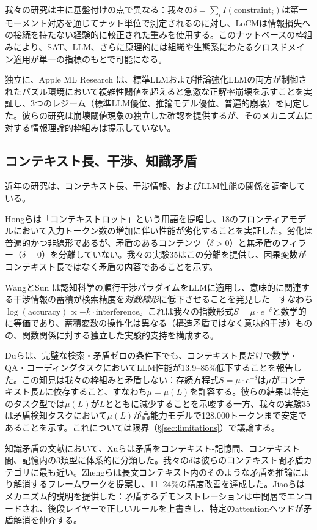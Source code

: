 \documentclass[11pt,a4paper]{article}
\begin{document}
我々の研究は主に基盤付けの点で異なる：我々の$\delta = \sum_i I(\text{constraint}_i)$は第一モーメント対応を通じてナット単位で測定されるのに対し、LoCMは情報損失への接続を持たない経験的に較正された重みを使用する。このナットベースの枠組みにより、SAT、LLM、さらに原理的には組織や生態系にわたるクロスドメイン適用が単一の指標のもとで可能になる。

独立に、Apple ML Research \cite{apple2025illusion}は、標準LLMおよび推論強化LLMの両方が制御されたパズル環境において複雑性閾値を超えると急激な正解率崩壊を示すことを実証し、3つのレジーム（標準LLM優位、推論モデル優位、普遍的崩壊）を同定した。彼らの研究は崩壊閾値現象の独立した確認を提供するが、そのメカニズムに対する情報理論的枠組みは提示していない。

\subsection{コンテキスト長、干渉、知識矛盾}

近年の研究は、コンテキスト長、干渉情報、およびLLM性能の関係を調査している。

Hongら\cite{hong2025contextrot}は「コンテキストロット」という用語を提唱し、18のフロンティアモデルにおいて入力トークン数の増加に伴い性能が劣化することを実証した。劣化は普遍的かつ非線形であるが、矛盾のあるコンテンツ（$\delta > 0$）と無矛盾のフィラー（$\delta = 0$）を分離していない。我々の実験35はこの分離を提供し、因果変数がコンテキスト長ではなく矛盾の内容であることを示す。

WangとSun \cite{wang2025interference}は認知科学の順行干渉パラダイムをLLMに適用し、意味的に関連する干渉情報の蓄積が検索精度を\emph{対数線形}に低下させることを発見した---すなわち$\log(\text{accuracy}) \propto -k \cdot \text{interference}$。これは我々の指数形式$S = \mu \cdot e^{-\delta}$と数学的に等価であり、蓄積変数の操作化は異なる（構造矛盾ではなく意味的干渉）ものの、関数関係に対する独立した実験的支持を構成する。

Duら\cite{du2025contextlength}は、完璧な検索・矛盾ゼロの条件下でも、コンテキスト長だけで数学・QA・コーディングタスクにおいてLLM性能が13.9--85\%低下することを報告した。この知見は我々の枠組みと矛盾しない：存続方程式$S = \mu \cdot e^{-\delta}$は$\mu$がコンテキスト長$L$に依存すること、すなわち$\mu = \mu(L)$を許容する。彼らの結果は特定のタスク型では$\mu(L)$が$L$とともに減少することを示唆する一方、我々の実験35は矛盾検知タスクにおいて$\mu(L)$が高能力モデルで128{,}000トークンまで安定であることを示す。これについては限界（\S\ref{sec:limitations}）で議論する。

知識矛盾の文献において、Xuら\cite{xu2024knowledge}は矛盾をコンテキスト-記憶間、コンテキスト間、記憶内の3類型に体系的に分類した。我々の$\delta$は彼らのコンテキスト間矛盾カテゴリに最も近い。Zhengら\cite{zheng2025kcr}は長文コンテキスト内のそのような矛盾を推論により解消するフレームワークを提案し、11--24\%の精度改善を達成した。Jiaoら\cite{jiao2026demonstration}はメカニズム的説明を提供した：矛盾するデモンストレーションは中間層でエンコードされ、後段レイヤーで正しいルールを上書きし、特定のattentionヘッドが矛盾解消を仲介する。
\end{document}
